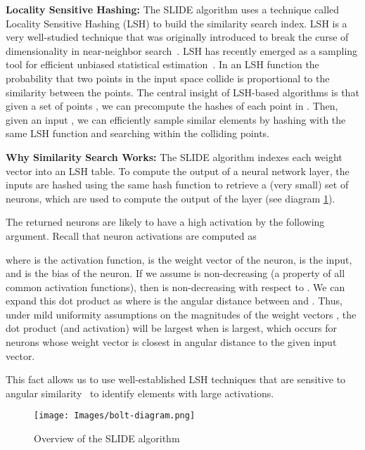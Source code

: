 \documentclass[sigconf]{acmart}
\begin{document}
\noindent\textbf{Locality Sensitive Hashing:}
The SLIDE algorithm uses a technique called Locality Sensitive Hashing (LSH) to build the similarity search index. LSH is a very well-studied technique that was originally introduced to break the curse of dimensionality in near-neighbor search~\cite{indyk1998approximate,andoni2008near,andoni2015optimal,andoni2014beyond,10.1145/997817.997857}. LSH has recently emerged as a sampling tool for efficient unbiased statistical estimation~\cite{spring2017scalable,charikar2017hashing,backurs2019space,siminelakis2019rehashing}. In an LSH function the probability that two points in the input space collide is proportional to the similarity between the points. The central insight of LSH-based algorithms is that given a set of points , we can precompute the hashes of each point in . Then, given an input , we can efficiently sample similar elements  by hashing  with the same LSH function and searching within the colliding points. 





\noindent\textbf{Why Similarity Search Works:}
The SLIDE algorithm indexes each weight vector  into an LSH table. To compute the output of a neural network layer, the inputs are hashed using the same hash function to retrieve a (very small) set of neurons, which are used to compute the output of the layer (see diagram \ref{fig:slide}).

The returned neurons are likely to have a high activation by the following argument. Recall that neuron activations are computed as 

where  is the activation function,  is the weight vector of the neuron,  is the input, and  is the bias of the neuron. If we assume  is non-decreasing (a property of all common activation functions), then  is non-decreasing with respect to . We can expand this dot product as  where  is the angular distance between  and . Thus, under mild uniformity assumptions on the magnitudes of the weight vectors , the dot product (and activation) will be largest when  is largest, which occurs for neurons whose weight vector is closest in angular distance to the given input vector.

This fact allows us to use well-established LSH techniques that are sensitive to angular similarity~\cite{goemans1994879,charikar2002similarity,li2012one,shrivastava2014improved} to identify elements with large activations. 



\begin{figure}
    \centering
    \texttt{[image: Images/bolt-diagram.png]}
    \caption{Overview of the SLIDE algorithm}
    \label{fig:slide}
    \vspace{-0.5cm}
\end{figure}
\end{document}
